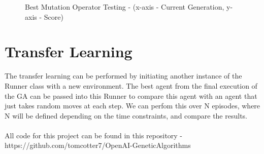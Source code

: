 \begin{figure}[ht]
{\begin{minipage}[c]{0.3\textwidth}
    \end{minipage}}
  \hfill
  \hfill
  \caption{Best Mutation Operator Testing - (x-axis - Current Generation, y-axis - Score)}
  \label{fig:mot}
\end{figure}


\section{Transfer Learning}

The transfer learning can be performed by initiating another instance of the Runner class with a new environment. The best agent from the final execution of the GA can be passed into this Runner to compare this agent with an agent that just takes random moves at each step. We can perfom this over N episodes, where N will be defined depending on the time constraints, and compare the results.

\paragraph{}

All code for this project can be found in this repository - https://github.com/tomcotter7/OpenAI-GeneticAlgorithms
